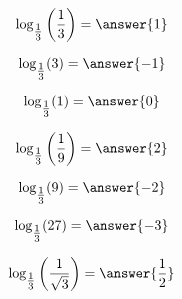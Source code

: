 \documentclass{ximera}
\author{Lee Wayand}
\begin{document}
\begin{example}













\[
\log_{ \tfrac{1}{3} }\left( \frac{1}{3} \right) = \answer{1}
\]





\[
\log_{ \tfrac{1}{3} }(3) = \answer{-1}
\]







\[
\log_{ \tfrac{1}{3} }(1) = \answer{0}
\]





\[
\log_{ \tfrac{1}{3} }\left( \frac{1}{9} \right) = \answer{2}
\]





\[
\log_{ \tfrac{1}{3} }(9) = \answer{-2}
\]







\[
\log_{ \tfrac{1}{3} }(27) = \answer{-3}
\]





\[
\log_{ \tfrac{1}{3} }\left( \frac{1}{\sqrt{3}} \right) = \answer{\frac{1}{2}}
\]





\end{example}
\end{document}
